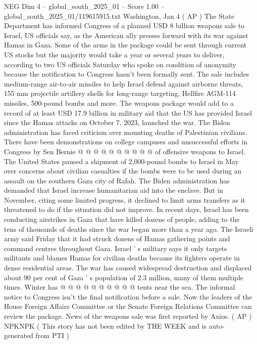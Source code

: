 \begin{textsample}{NEG Dim 4 – global\_south\_2025\_01 – Score 1.00 – global\_south\_2025\_01/119615915.txt}  \label{ex:f4_neg_446}
Washington, Jan 4 ( AP ) The State Department has informed Congress of a planned USD 8 billion weapons sale to Israel, US officials say, as the American ally presses forward with its war against Hamas in Gaza.
Some of the arms in the package could be sent through current US stocks but the majority would take a year or several years to deliver, according to two US officials Saturday who spoke on condition of anonymity because the notification to Congress hasn't been formally sent.
The sale includes medium-range air-to-air missiles to help Israel defend against airborne threats, 155 mm projectile artillery shells for long-range targeting, Hellfire AGM-114 missiles, 500-pound bombs and more.
The weapons package would add to a record of at least USD 17.9 billion in military aid that the US has provided Israel since the Hamas attacks on October 7, 2023, launched the war.
The Biden administration has faced criticism over mounting deaths of Palestinian civilians.
There have been demonstrations on college campuses and unsuccessful efforts in Congress by Sen Bernie @ @ @ @ @ @ @ @ @ @ of offensive weapons to Israel.
The United States paused a shipment of 2,000-pound bombs to Israel in May over concerns about civilian casualties if the bombs were to be used during an assault on the southern Gaza city of Rafah.
The Biden administration has demanded that Israel increase humanitarian aid into the enclave.
But in November, citing some limited progress, it declined to limit arms transfers as it threatened to do if the situation did not improve.
In recent days, Israel has been conducting airstrikes in Gaza that have killed dozens of people, adding to the tens of thousands of deaths since the war began more than a year ago.
The Israeli army said Friday that it had struck dozens of Hamas gathering points and command centres throughout Gaza.
Israel ' s military says it only targets militants and blames Hamas for civilian deaths because its fighters operate in dense residential areas.
The war has caused widespread destruction and displaced about 90 per cent of Gaza ' s population of 2.3 million, many of them multiple times.
Winter has @ @ @ @ @ @ @ @ @ @ tents near the sea.
The informal notice to Congress isn't the final notification before a sale.
Now the leaders of the House Foreign Affairs Committee or the Senate Foreign Relations Committee can review the package.
News of the weapons sale was first reported by Axios. ( AP ) NPKNPK ( This story has not been edited by THE WEEK and is auto-generated from PTI )

\end{textsample}
